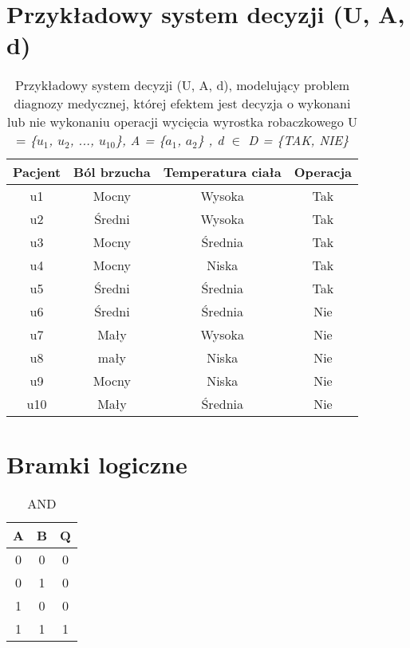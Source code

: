 \documentclass[12pt, letterpaper, titlepage]{article}
\begin{document}
\section{Przykładowy system decyzji (U, A, d)}

\begin{table}[h]
\centering\caption{Przykładowy system decyzji (U, A, d), modelujący problem diagnozy medycznej, której efektem jest decyzja o wykonani lub nie wykonaniu operacji wycięcia wyrostka robaczkowego U = \textit{{\{$u_1$, $u_2$, ..., $u_{10}$}\}, A = {\{$a_1$, $a_2$}\} ,  d $\in$ D = {\{TAK, NIE}\}}\newline}
\begin{tabular}{c| c c c}
\hline
\hline
Pacjent & Ból brzucha & Temperatura ciała & Operacja\\
\hline
u1 & Mocny & Wysoka & Tak\\

u2 & Średni & Wysoka & Tak\\

u3 & Mocny & Średnia & Tak\\

u4 & Mocny & Niska & Tak\\

u5 & Średni & Średnia & Tak\\

u6 & Średni & Średnia & Nie\\

u7 & Mały & Wysoka & Nie\\

u8 & mały & Niska & Nie\\

u9 & Mocny & Niska & Nie\\

u10 & Mały & Średnia & Nie\\

\hline
\hline
\end{tabular}
\end{table}

\section{Bramki logiczne}

\begin{table}[h!]
\centering\caption{AND}
\begin{tabular}{c c| c}

A & B & Q\\
\hline
0 & 0 & 0\\
0 & 1 & 0\\
1 & 0 & 0\\
1 & 1 & 1\\

\end{tabular}
\end{table}
\end{document}
